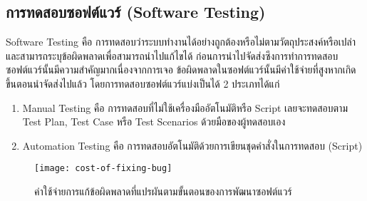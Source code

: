     \subsection{การทดสอบซอฟต์แวร์ (Software Testing)}
        Software Testing คือ การทดสอบว่าระบบทำงานได้อย่างถูกต้องหรือไม่ตามวัตถุประสงค์หรือเปล่าและสามารถระบุข้อผิดพลาดเพื่อสามารถนำไปแก้ไขได้
        ก่อนการนำไปจัดส่งซึงการทำการทดสอบซอฟต์แวร์นั้นมีความสำคัญมากเนื่องจากการเจอ ข้อผิดพลาดในซอฟต์แวร์นั้นมีค่าใช้จ่ายที่สูงหากเกิดขึ้นตอนนำจัดส่งไปแล้ว
        โดยการทดสอบซอฟต์แวร์แบ่งเป็นได้ 2 ประเภทได้แก่
        \begin{enumerate}
            \item Manual Testing คือ การทดสอบที่ไม่ใช้เครื่องมืออัตโนมัติหรือ Script เลยจะทดสอบตาม Test Plan, Test Case หรือ Test Scenarios ด้วยมือของผู้ทดสอบเอง
            \item Automation Testing คือ การทดสอบอัตโนมัติด้วยการเขียนชุดคำสั่งในการทดสอบ (Script)
        \end{enumerate}
        \begin{figure}[H]
            \centering
            \texttt{[image: cost-of-fixing-bug]}
            \caption{ค่าใช้จ่ายการแก้ข้อผิดพลาดที่แปรผันตามขั้นตอนของการพัฒนาซอฟต์แวร์}\label{cost-of-fixing-bug}
        \end{figure}

